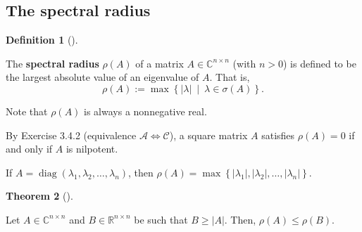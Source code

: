\documentclass[numbers=enddot,12pt,final,onecolumn,notitlepage]{scrartcl}%
\numberwithin{exer}{subsection}
\theoremstyle{definition}
\newtheorem{theo}{Theorem}[subsection]
\newenvironment{theorem}[1][]
{\begin{theo}[#1]\begin{leftbar}}
{\end{leftbar}\end{theo}}
\newtheorem{defi}[theo]{Definition}
\newenvironment{definition}[1][]
{\begin{defi}[#1]\begin{leftbar}}
{\end{leftbar}\end{defi}}
\begin{document}
\subsection{The spectral radius}

\begin{definition}
The \textbf{spectral radius} $\rho\left(  A\right)  $ of a matrix
$A\in\mathbb{C}^{n\times n}$ (with $n>0$) is defined to be the largest
absolute value of an eigenvalue of $A$. That is,%
\[
\rho\left(  A\right)  :=\max\left\{  \left\vert \lambda\right\vert
\ \mid\ \lambda\in\sigma\left(  A\right)  \right\}  .
\]


Note that $\rho\left(  A\right)  $ is always a nonnegative real.
\end{definition}

By Exercise 3.4.2 (equivalence $\mathcal{A}\Longleftrightarrow\mathcal{C}$), a
square matrix $A$ satisfies $\rho\left(  A\right)  =0$ if and only if $A$ is nilpotent.

If $A=\operatorname*{diag}\left(  \lambda_{1},\lambda_{2},\ldots,\lambda
_{n}\right)  $, then $\rho\left(  A\right)  =\max\left\{  \left\vert
\lambda_{1}\right\vert ,\left\vert \lambda_{2}\right\vert ,\ldots,\left\vert
\lambda_{n}\right\vert \right\}  $.

\begin{theorem}
Let $A\in\mathbb{C}^{n\times n}$ and $B\in\mathbb{R}^{n\times n}$ be such that
$B\geq\left\vert A\right\vert $. Then, $\rho\left(  A\right)  \leq\rho\left(
B\right)  $.
\end{theorem}
\end{document}

